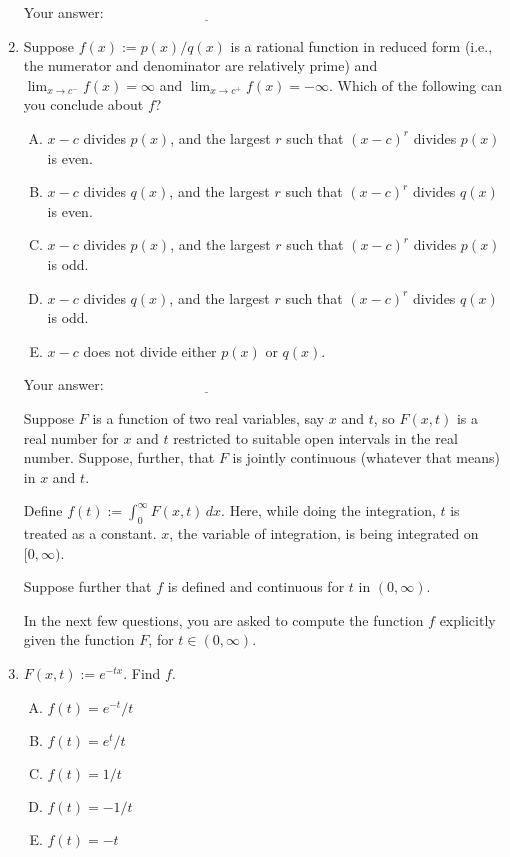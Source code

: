 \documentclass[10pt]{amsart}
\begin{document}
\begin{enumerate}
  \vspace{0.1in}
  Your answer: $\underline{\qquad\qquad\qquad\qquad\qquad\qquad\qquad}$
  \vspace{0.15in}

\item Suppose $f(x) := p(x)/q(x)$ is a rational function in reduced
  form (i.e., the numerator and denominator are relatively prime) and
  $\lim_{x \to c^-} f(x) = \infty$ and $\lim_{x \to c^+} f(x) =
  -\infty$. Which of the following can you conclude about $f$?
  \begin{enumerate}[(A)]
  \item $x - c$ divides $p(x)$, and the largest $r$ such that $(x -
    c)^r$ divides $p(x)$ is even.
  \item $x - c$ divides $q(x)$, and the largest $r$ such that $(x -
    c)^r$ divides $q(x)$ is even.
  \item $x - c$ divides $p(x)$, and the largest $r$ such that $(x -
    c)^r$ divides $p(x)$ is odd.
  \item $x - c$ divides $q(x)$, and the largest $r$ such that $(x -
    c)^r$ divides $q(x)$ is odd.
  \item $x - c$ does not divide either $p(x)$ or $q(x)$.
  \end{enumerate}

  \vspace{0.1in}
  Your answer: $\underline{\qquad\qquad\qquad\qquad\qquad\qquad\qquad}$
  \vspace{0.15in}

  Suppose $F$ is a function of two real variables, say $x$
  and $t$, so $F(x,t)$ is a real number for $x$ and $t$ restricted to
  suitable open intervals in the real number. Suppose, further, that $F$
  is jointly continuous (whatever that means) in $x$ and $t$.

  Define $f(t) := \int_0^\infty F(x,t) \, dx$. Here, while doing the
  integration, $t$ is treated as a constant. $x$, the variable of
  integration, is being integrated on $[0,\infty)$.
    
  Suppose further that $f$ is defined and continuous for $t$ in
  $(0,\infty)$.

  In the next few questions, you are asked to compute the function $f$
  explicitly given the function $F$, for $t \in (0,\infty)$.

\item $F(x,t) := e^{-tx}$. Find $f$.

  \begin{enumerate}[(A)]
  \item $f(t) = e^{-t}/t$
  \item $f(t) = e^t/t$
  \item $f(t) = 1/t$
  \item $f(t) = -1/t$
  \item $f(t) = -t$
  \end{enumerate}


\end{enumerate}
\end{document}
